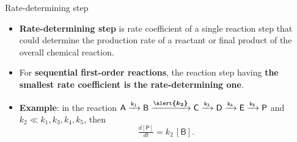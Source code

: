 %
%
\begin{frame}{Rate-determining step}
	\begin{itemize}
		\item \alert{\bf Rate-determining step} is rate coefficient of a single reaction step that could determine 
		 the production rate of a reactant or final product of the overall chemical reaction. 
		\pause
		\item For {\bf sequential first-order reactions}, the reaction step having \alert{\bf the smallest rate coefficient is the rate-determining one}.
		\pause
		\item {\bf Example}: in the reaction 
		$\mathsf{A \xrightarrow[]{k_1} B \xrightarrow[]{\boldsymbol{\alert{k_2}}} C \xrightarrow[]{k_3} D \xrightarrow[]{k_4} E \xrightarrow[]{k_5} P}$ and 
		$k_2 \ll k_1, k_3, k_4, k_5$, then 
		\[\tfrac{d\mathsf{[P]}}{dt} = k_2 \, \mathsf{[B]}.\]
	\end{itemize}
\end{frame}
%
%
